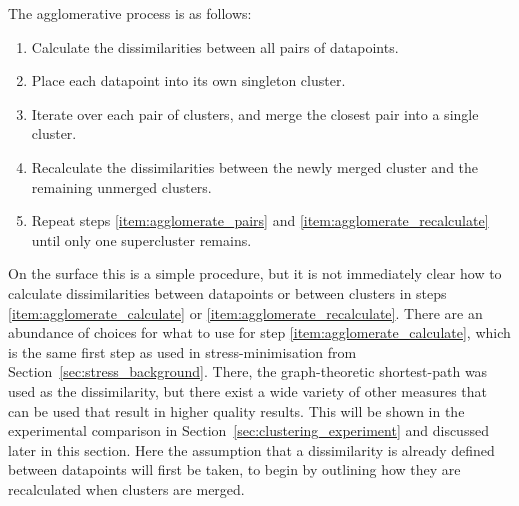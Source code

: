 The agglomerative process is as follows:
\begin{mdframed}[backgroundcolor=WhiteSmoke]
\begin{enumerate}[leftmargin=*]
  \item Calculate the dissimilarities between all pairs of datapoints. \label{item:agglomerate_calculate}
  \item Place each datapoint into its own singleton cluster.
  \item Iterate over each pair of clusters, and merge the closest pair into a single cluster. \label{item:agglomerate_pairs}
  \item Recalculate the dissimilarities between the newly merged cluster and the remaining unmerged clusters. \label{item:agglomerate_recalculate}
  \item Repeat steps \ref{item:agglomerate_pairs} and \ref{item:agglomerate_recalculate} until only one supercluster remains.
\end{enumerate}
\end{mdframed}
On the surface this is a simple procedure, but it is not immediately clear how to calculate dissimilarities between datapoints or between clusters in steps \ref{item:agglomerate_calculate} or \ref{item:agglomerate_recalculate}.
There are an abundance of choices for what to use for step \ref{item:agglomerate_calculate}, which is the same first step as used in stress-minimisation from Section~\ref{sec:stress_background}. There, the graph-theoretic shortest-path was used as the dissimilarity, but there exist a wide variety of other measures that can be used that result in higher quality results. This will be shown in the experimental comparison in Section~\ref{sec:clustering_experiment} and discussed later in this section. Here the assumption that a dissimilarity is already defined between datapoints will first be taken, to begin by outlining how they are recalculated when clusters are merged.

